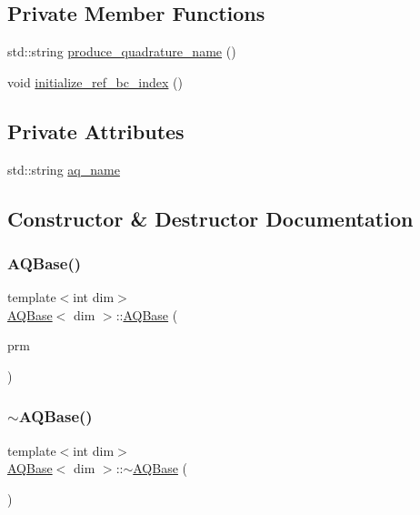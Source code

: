 \subsection*{Private Member Functions}
\begin{DoxyCompactItemize}
\item 
std\+::string \hyperlink{class_a_q_base_a4ae1370033705c82d08686fd651ad6e8}{produce\+\_\+quadrature\+\_\+name} ()
\item 
void \hyperlink{class_a_q_base_aafde5b4c9ce19b1c6c4a8d37787f13b2}{initialize\+\_\+ref\+\_\+bc\+\_\+index} ()
\end{DoxyCompactItemize}
\subsection*{Private Attributes}
\begin{DoxyCompactItemize}
\item 
std\+::string \hyperlink{class_a_q_base_a3e50d2d59d1a4a2fabed3c4852f80c49}{aq\+\_\+name}
\end{DoxyCompactItemize}


\subsection{Constructor \& Destructor Documentation}
\mbox{\label{class_a_q_base_a3a05ceb6b201b4e6e605b260d766842d}} 
\subsubsection{\texorpdfstring{A\+Q\+Base()}{AQBase()}}
{\footnotesize\ttfamily template$<$int dim$>$ \\
\hyperlink{class_a_q_base}{A\+Q\+Base}$<$ dim $>$\+::\hyperlink{class_a_q_base}{A\+Q\+Base} (\begin{DoxyParamCaption}\item[{Parameter\+Handler \&}]{prm }\end{DoxyParamCaption})}

\mbox{\label{class_a_q_base_ab394068aae3c9b3f3932c3bfa3edceab}} 
\subsubsection{\texorpdfstring{$\sim$\+A\+Q\+Base()}{~AQBase()}}
{\footnotesize\ttfamily template$<$int dim$>$ \\
\hyperlink{class_a_q_base}{A\+Q\+Base}$<$ dim $>$\+::$\sim$\hyperlink{class_a_q_base}{A\+Q\+Base} (\begin{DoxyParamCaption}{ }\end{DoxyParamCaption})\hspace{0.3cm}{\ttfamily [virtual]}}



